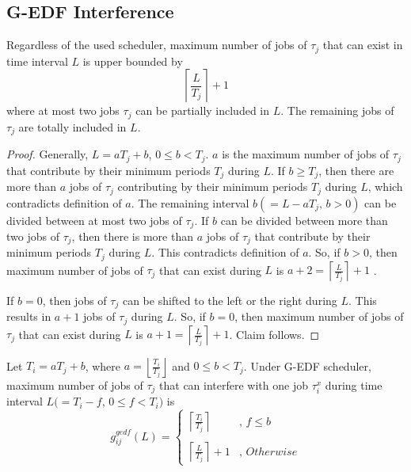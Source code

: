 \subsection{G-EDF Interference}\label{sec:g-edf interference and workload}
%
\begin{clm}\label{clm:max_job_no_exist_j_interval_r}
%
Regardless of the used scheduler, maximum number of jobs of $\tau_{j}$
that can exist in time interval $L$ is upper bounded by 
\begin{equation}
\left\lceil\frac{L}{T_{j}}\right\rceil+1\label{eq:max_job_no_exist_j_interval_r}
\end{equation}
where at most two jobs $\tau_{j}$ can be partially included in $L$.
The remaining jobs of $\tau_{j}$ are totally included in $L$.
%
\end{clm}
%
\begin{proof}
%
Generally, $L=aT_{j}+b$, $0\le b<T_{j}$. $a$ is the maximum number
of jobs of $\tau_{j}$ that contribute by their minimum periods $T_{j}$
during $L$. If $b\ge T_{j}$, then there are more than $a$ jobs
of $\tau_{j}$ contributing by their minimum periods $T_{j}$ during
$L$, which contradicts definition of $a$. The remaining interval
$b(=L-aT_{j},\, b>0)$ can be divided between at most two jobs of
$\tau_{j}$. If $b$ can be divided between more than two jobs of
$\tau_{j}$, then there is more than $a$ jobs of $\tau_{j}$ that
contribute by their minimum periods $T_{j}$ during $L$. This contradicts
definition of $a$. So, if $b>0$, then maximum number of jobs of
$\tau_{j}$ that can exist during $L$ is $a+2=\left\lceil \frac{L}{T_{j}}\right\rceil +1$
.

If $b=0$, then jobs of $\tau_{j}$ can be shifted to the left or
the right during $L$. This results in $a+1$ jobs of $\tau_{j}$
during $L$. So, if $b=0$, then maximum number of jobs of $\tau_{j}$
that can exist during $L$ is $a+1=\left\lceil \frac{L}{T_{j}}\right\rceil +1$.
Claim follows. 
%
\end{proof}
%
\begin{clm}\label{clm:gedf_max_job_no_interfer_j_i}
%
Let $T_{i}=aT_{j}+b$, where $a=\left\lfloor\frac{T_i}{T_j}\right\rfloor$ and $0\le b<T_{j}$. Under G-EDF scheduler, maximum
number of jobs of $\tau_{j}$ that can interfere with one job $\tau_{i}^{x}$
during time interval $L(=T_{i}-f$, $0\le f<T_{i})$ is 
\begin{equation}
g_{ij}^{gedf}\left(L\right)=
\begin{cases}
\left\lceil \frac{T_{i}}{T_{j}}\right\rceil  & ,\, f\le b\\
\\
\left\lceil \frac{L}{T_{j}}\right\rceil +1 & ,\, Otherwise
\end{cases}\label{eq:gedf_max_job_no_interfer_j_i}
\end{equation}
%
\end{clm}
